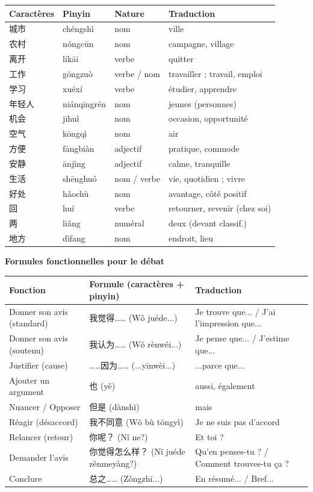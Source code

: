 \documentclass[11pt]{article}
\begin{document}
\begin{center}\begin{tabularx}{\linewidth}{|X|X|X|X|}\hline
\rowcolor{popblueL} Caractères & Pinyin & Nature & Traduction \\ \hline
城市 & chéngshì & nom & ville \\ \hline
农村 & nóngcūn & nom & campagne, village \\ \hline
离开 & líkāi & verbe & quitter \\ \hline
工作 & gōngzuò & verbe / nom & travailler ; travail, emploi \\ \hline
学习 & xuéxí & verbe & étudier, apprendre \\ \hline
年轻人 & niánqīngrén & nom & jeunes (personnes) \\ \hline
机会 & jīhuì & nom & occasion, opportunité \\ \hline
空气 & kōngqì & nom & air \\ \hline
方便 & fāngbiàn & adjectif & pratique, commode \\ \hline
安静 & ānjìng & adjectif & calme, tranquille \\ \hline
生活 & shēnghuó & nom / verbe & vie, quotidien ; vivre \\ \hline
好处 & hǎochù & nom & avantage, côté positif \\ \hline
回 & huí & verbe & retourner, revenir (chez soi) \\ \hline
两 & liǎng & numéral & deux (devant classif.) \\ \hline
地方 & dìfang & nom & endroit, lieu \\ \hline
\end{tabularx}\end{center}

\textbf{Formules fonctionnelles pour le débat}

\begin{center}\begin{tabularx}{\linewidth}{|X|X|X|}\hline
\rowcolor{popblueL} Fonction & Formule (caractères + pinyin) & Traduction \\ \hline
Donner son avis (standard) & 我觉得…… (Wǒ juéde...) & Je trouve que... / J'ai l'impression que... \\ \hline
Donner son avis (soutenu) & 我认为…… (Wǒ rènwéi...) & Je pense que... / J'estime que... \\ \hline
Justifier (cause) & ……因为…… (...yīnwèi...) & ...parce que... \\ \hline
Ajouter un argument & 也 (yě) & aussi, également \\ \hline
Nuancer / Opposer & 但是 (dànshì) & mais \\ \hline
Réagir (désaccord) & 我不同意 (Wǒ bù tóngyì) & Je ne suis pas d'accord \\ \hline
Relancer (retour) & 你呢？ (Nǐ ne?) & Et toi ? \\ \hline
Demander l'avis & 你觉得怎么样？ (Nǐ juéde zěnmeyàng?) & Qu'en penses-tu ? / Comment trouves-tu ça ? \\ \hline
Conclure & 总之…… (Zǒngzhī...) & En résumé... / Bref... \\ \hline
\end{tabularx}\end{center}
\end{document}

